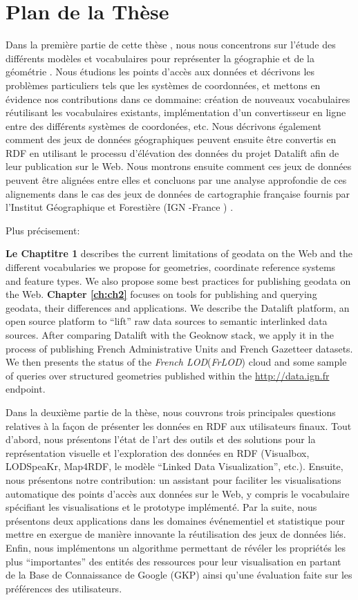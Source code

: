 \documentclass[a4paper,11pt,twoside]{report}
\begin{document}
\chapter*{Plan de la Thèse} 
\label{sec:thesis-structure}

Dans la première partie de cette thèse , nous nous concentrons sur l'étude des différents modèles et vocabulaires pour représenter la géographie et de la géométrie . Nous étudions les points d'accès aux données et décrivons les problèmes particuliers tels que les systèmes de coordonnées, et mettons en évidence nos contributions dans ce dommaine: création de nouveaux vocabulaires réutilisant les vocabulaires existants, implémentation d'un convertisseur en ligne entre des différents systèmes de coordonées, etc. Nous décrivons également comment des jeux de données géographiques peuvent ensuite être convertis en RDF en utilisant le processu d'élévation des données du projet Datalift afin de leur publication sur le Web. Nous montrons ensuite comment ces jeux de données peuvent être alignées entre elles et concluons par une analyse approfondie de ces alignements dans le cas des jeux de données de cartographie française fournis par l'Institut Géographique et Forestière (IGN -France ) . 

Plus précisement:

 
  \textbf{Le Chaptitre 1} describes the current limitations of geodata on the Web and the different vocabularies we propose for geometries, coordinate reference systems and feature  types. We also propose  some best practices for publishing geodata on the Web.
 \textbf{Chapter \ref{ch:ch2}} focuses on tools for publishing and querying geodata, their differences and applications. We describe the Datalift platform, an open source platform to ``lift'' raw data sources to semantic interlinked data sources. After comparing Datalift with the Geoknow stack, we apply it in the process of publishing French Administrative Units and French Gazetteer datasets. We then presents the status of the \textit{French LOD}(\textit{FrLOD}) cloud and some sample of queries over structured geometries published within the \url{http://data.ign.fr} endpoint. 
 
 
 Dans la deuxième partie de la thèse, nous couvrons trois principales questions relatives à la façon de présenter les données en RDF aux utilisateurs finaux. Tout d'abord, nous présentons l'état de l'art des outils et des solutions pour la représentation visuelle et l'exploration des données en RDF (Visualbox, LODSpeaKr, Map4RDF, le modèle ``Linked Data Visualization'', etc.). Ensuite, nous présentons notre contribution: un assistant pour faciliter les visualisations automatique des points d'accès aux données sur le Web, y compris le vocabulaire spécifiant les visualisations et le prototype implémenté. Par la suite, nous présentons deux applications dans les domaines événementiel et statistique pour mettre en exergue de manière innovante la réutilisation des jeux de données liés. Enfin, nous implémentons un algorithme permettant de révéler les propriétés les plus ``importantes'' des entités des ressources pour leur visualisation en partant de la Base de Connaissance de Google (GKP) ainsi qu'une évaluation faite sur les préférences des utilisateurs. 
 
\end{document}
